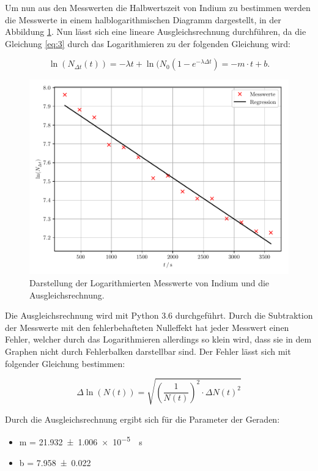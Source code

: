 Um nun aus den Messwerten die Halbwertszeit von Indium zu bestimmen werden die
Messwerte in einem halblogarithmischen Diagramm dargestellt, in der Abbildung \ref{abb:3}.
Nun lässt sich eine lineare Ausgleichsrechnung durchführen, da die Gleichung
\ref{eq:3} durch das Logarithmieren zu der folgenden Gleichung wird:

\begin{equation}
  \ln(N_{\Delta t}(t)) = -\lambda t + \ln(N_0(1-e^{-\lambda \Delta t}) = - m \cdot t + b.
  \label{eq:4}
\end{equation}

\begin{figure}[H]
  \centering
  \includegraphics{plot3.pdf}
  \caption{Darstellung der Logarithmierten Messwerte von Indium und die Ausgleichsrechnung.}
  \label{abb:3}
\end{figure}

Die Ausgleichsrechnung wird mit Python 3.6 durchgeführt. Durch die Subtraktion der
Messwerte mit den fehlerbehafteten Nulleffekt hat jeder Messwert einen Fehler, welcher
durch das Logarithmieren allerdings so klein wird, dass sie in dem Graphen nicht
durch Fehlerbalken darstellbar sind. Der Fehler lässt sich mit folgender Gleichung
bestimmen:

\begin{equation*}
  \Delta \ln(N(t)) = \sqrt{\left( \frac{1}{N(t)}\right)^2 \cdot \Delta N(t)^2}
\end{equation*}

Durch die Ausgleichsrechnung ergibt sich für die Parameter der Geraden:

\begin{itemize}
  \item m = \SI{21.932(1006)e-5}{\per\second}
  \item b = \num{7.958(22)}
\end{itemize}

